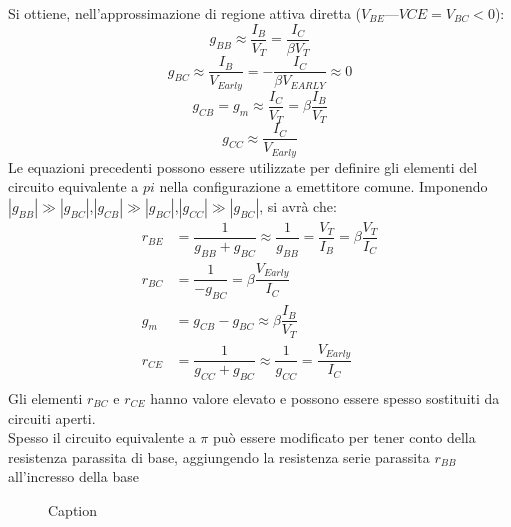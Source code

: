 %
Si ottiene, nell'approssimazione di regione attiva diretta ($V_{BE} — V{CE} = V_{BC} < 0$):
%
\begin{equation}
    g_{BB} \approx \dfrac{I_B}{V_T}=\dfrac{I_C}{\beta V_T}
\end{equation}
%
\begin{equation}
    g_{BC} \approx \dfrac{I_B}{V_{Early}} = -\dfrac{I_C}{\beta V_{EARLY}} \approx 0
\end{equation}
%
\begin{equation}
    g_{CB}=g_{m} \approx \dfrac{I_C}{V_T} =\beta \dfrac{I_B}{V_{T}}
\end{equation}
%
\begin{equation}
    g_{CC} \approx \dfrac{I_C}{V_{Early}}
\end{equation}
%
Le equazioni precedenti possono essere utilizzate per definire gli elementi del circuito equivalente a $pi$ nella configurazione a emettitore comune.
Imponendo $|g_{BB}|\gg|g_{BC}|$,$|g_{CB}|\gg|g_{BC}|$,$|g_{CC}|\gg|g_{BC}|$, si avrà che: 
%
\begin{align}
    r_{BE}&=\dfrac{1}{g_{BB}+g_{BC}}\approx \dfrac{1}{g_{BB}}=\dfrac{V_T}{I_B}= \beta \dfrac{V_T}{I_C} \\
    r_{BC}&= \dfrac{1}{-g_{BC}}= \beta \dfrac{V_{Early}}{I_C} \\
    g_m &=g_{CB}-g_{BC}\approx \beta \dfrac{I_B}{V_T} \\
    r_{CE} &= \dfrac{1}{g_{CC}+g_{BC}}\approx \dfrac{1}{g_{CC}}= \dfrac{V_{Early}}{I_C} \\
\end{align}
%
Gli elementi $r_{BC}$ e $r_{CE}$ hanno valore elevato e possono essere spesso sostituiti da circuiti aperti.\\
Spesso il circuito equivalente a $\pi$ può essere modificato per tener
conto della resistenza parassita di base, aggiungendo la resistenza
serie parassita $r_{BB}$ all'incresso della base
%
\begin{figure}[hbt!]
    \centering
    \caption{Caption}
    \label{fig:enter-label}
\end{figure}\\
